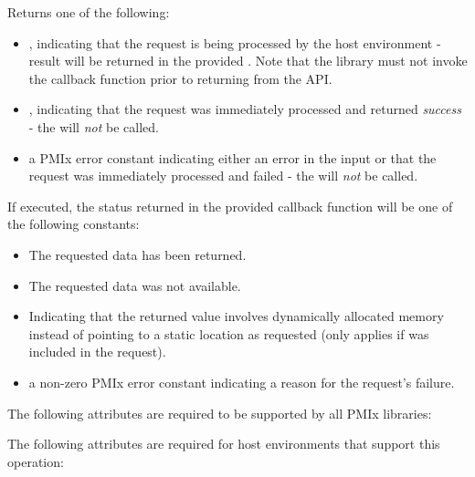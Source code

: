 Returns one of the following:

\begin{itemize}
    \item {}, indicating that the request is being processed by the host environment - result will be returned in the provided . Note that the library must not invoke the callback function prior to returning from the \ac{API}.
    \item {}, indicating that the request was immediately processed and returned \textit{success} - the  will \textit{not} be called.
    \item a \ac{PMIx} error constant indicating either an error in the input or that the request was immediately processed and failed - the  will \textit{not} be called.
\end{itemize}

If executed, the status returned in the provided callback function will be one of the following constants:

\begin{itemize}
\item {} The requested data has been returned.
\item {} The requested data was not available.
\item {} Indicating that the returned value
involves dynamically allocated memory instead of pointing to a static location
as requested  (only applies if  was included in the request).
\item a non-zero \ac{PMIx} error constant indicating a reason for the request's failure.
\end{itemize}

\reqattrstart
The following attributes are required to be supported by all \ac{PMIx} libraries:


\divider

The following attributes are required for host environments that support this operation:

